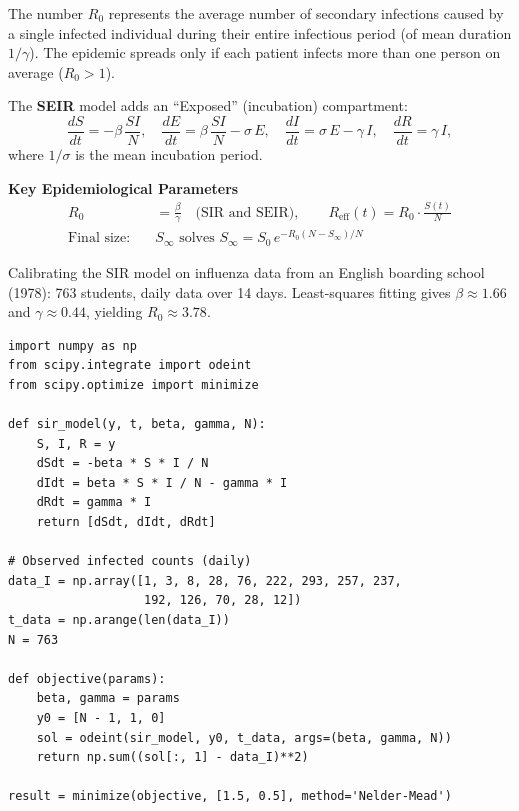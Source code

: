 \begin{intuition}
The number $R_0$ represents the average number of secondary infections
caused by a single infected individual during their entire infectious
period (of mean duration $1/\gamma$). The epidemic spreads only if each
patient infects more than one person on average ($R_0 > 1$).
\end{intuition}

\begin{definition}
The \textbf{SEIR} model adds an ``Exposed'' (incubation) compartment:
\[
  \frac{dS}{dt} = -\beta\,\frac{SI}{N}, \quad
  \frac{dE}{dt} = \beta\,\frac{SI}{N} - \sigma\,E, \quad
  \frac{dI}{dt} = \sigma\,E - \gamma\,I, \quad
  \frac{dR}{dt} = \gamma\,I,
\]
where $1/\sigma$ is the mean incubation period.
\end{definition}

\begin{keyformulas}
\textbf{Key Epidemiological Parameters}
\begin{align*}
  R_0 &= \frac{\beta}{\gamma} \quad \text{(SIR and SEIR)}, \qquad
  R_{\text{eff}}(t) = R_0 \cdot \frac{S(t)}{N} \\[4pt]
  \text{Final size:}\quad & S_\infty \text{ solves }
    S_\infty = S_0\, e^{-R_0(N - S_\infty)/N}
\end{align*}
\end{keyformulas}

\begin{example}
Calibrating the SIR model on influenza data from an English boarding
school (1978): 763 students, daily data over 14 days. Least-squares
fitting gives $\beta \approx 1.66$ and $\gamma \approx 0.44$,
yielding $R_0 \approx 3.78$.
\end{example}

\begin{verbatim}
import numpy as np
from scipy.integrate import odeint
from scipy.optimize import minimize

def sir_model(y, t, beta, gamma, N):
    S, I, R = y
    dSdt = -beta * S * I / N
    dIdt = beta * S * I / N - gamma * I
    dRdt = gamma * I
    return [dSdt, dIdt, dRdt]

# Observed infected counts (daily)
data_I = np.array([1, 3, 8, 28, 76, 222, 293, 257, 237,
                   192, 126, 70, 28, 12])
t_data = np.arange(len(data_I))
N = 763

def objective(params):
    beta, gamma = params
    y0 = [N - 1, 1, 0]
    sol = odeint(sir_model, y0, t_data, args=(beta, gamma, N))
    return np.sum((sol[:, 1] - data_I)**2)

result = minimize(objective, [1.5, 0.5], method='Nelder-Mead')
\end{verbatim}

